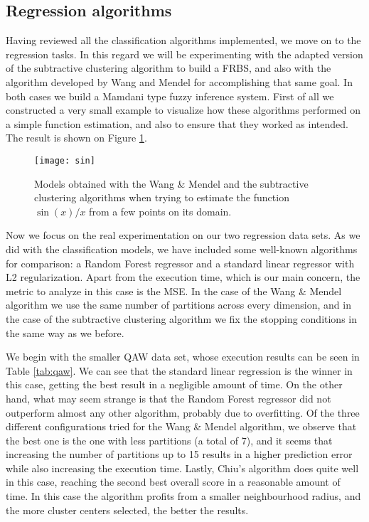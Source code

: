 \subsection{Regression algorithms}

Having reviewed all the classification algorithms implemented, we move on to the regression tasks. In this regard we will be experimenting with the adapted version of the subtractive clustering algorithm to build a FRBS, and also with the algorithm developed by Wang and Mendel for accomplishing that same goal. In both cases we build a Mamdani type fuzzy inference system. First of all we constructed a very small example to visualize how these algorithms performed on a simple function estimation, and also to ensure that they worked as intended. The result is shown on Figure \ref{fig:sin}.

\begin{figure}[h!]
\centering
\texttt{[image: sin]}
\caption{Models obtained with the Wang \& Mendel and the subtractive clustering algorithms when trying to estimate the function $\sin(x)/x$ from a few points on its domain.}
\label{fig:sin}
\end{figure}

Now we focus on the real experimentation on our two regression data sets. As we did with the classification models, we have included some well-known algorithms for comparison: a Random Forest regressor and a standard linear regressor with L2 regularization. Apart from the execution time, which is our main concern, the metric to analyze in this case is the MSE. In the case of the Wang \& Mendel algorithm we use the same number of partitions across every dimension, and in the case of the subtractive clustering algorithm we fix the stopping conditions in the same way as we before.

We begin with the smaller QAW data set, whose execution results can be seen in Table \ref{tab:qaw}. We can see that the standard linear regression is the winner in this case, getting the best result in a negligible amount of time. On the other hand, what may seem strange is that the Random Forest regressor did not outperform almost any other algorithm, probably due to overfitting. Of the three different configurations tried for the Wang \& Mendel algorithm, we observe that the best one is the one with less partitions (a total of 7), and it seems that increasing the number of partitions up to 15 results in a higher prediction error while also increasing the execution time. Lastly, Chiu's algorithm does quite well in this case, reaching the second best overall score in a reasonable amount of time. In this case the algorithm profits from a smaller neighbourhood radius, and the more cluster centers selected, the better the results.

